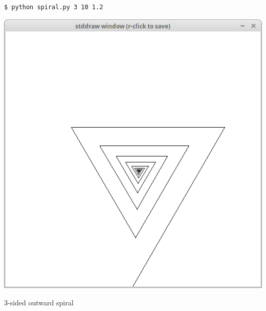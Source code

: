 \documentclass[8pt,a4paper,compress,handout]{beamer}
\begin{document}
\begin{frame}[fragile]
\begin{minipage}{200pt}
\begin{lstlisting}[language={}]
$ python spiral.py 3 10 1.2
\end{lstlisting}
\end{minipage}%
\hfill
\begin{minipage}{100pt}
\begin{center}
\includegraphics[scale=0.2]{figures/spiral1.png}

\smallskip

\tiny 3-sided outward spiral
\end{center}
\end{minipage}%

\bigskip


\end{frame}
\end{document}
